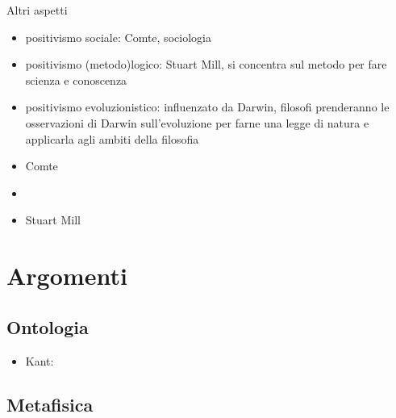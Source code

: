 \documentclass[letterpaper,10pt,italian]{jupyterBook}
\begin{document}
\sphinxAtStartPar
Altri aspetti
\begin{itemize}
\item {} 
\sphinxAtStartPar
positivismo sociale: Comte, sociologia

\item {} 
\sphinxAtStartPar
positivismo (metodo)logico: Stuart Mill, si concentra sul metodo per fare scienza e conoscenza

\item {} 
\sphinxAtStartPar
positivismo evoluzionistico: influenzato da Darwin, filosofi prenderanno le osservazioni di Darwin sull’evoluzione per farne una legge di natura e applicarla agli ambiti della filosofia

\end{itemize}

\sphinxAtStartPar
{}
\begin{itemize}
\item {} 
\sphinxAtStartPar
Comte

\item {} 
\sphinxAtStartPar
{}

\item {} 
\sphinxAtStartPar
Stuart Mill

\end{itemize}

\sphinxstepscope


\chapter{Argomenti}
\label{\detokenize{ch/topics:argomenti}}\label{\detokenize{ch/topics:philosophy-topics}}\label{\detokenize{ch/topics::doc}}

\section{Ontologia}
\label{\detokenize{ch/topics:ontologia}}\begin{itemize}
\item {} 
\sphinxAtStartPar
Kant:

\end{itemize}


\section{Metafisica}
\label{\detokenize{ch/topics:metafisica}}

\section{}
\label{\detokenize{ch/topics:id1}}






\renewcommand{\indexname}{Indice}
\printindex
\end{document}
